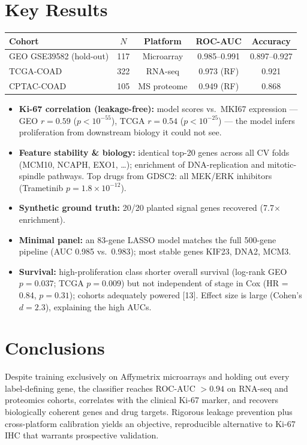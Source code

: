 \documentclass[10pt]{article}
\begin{document}
\section*{Key Results}
\begin{center}
\begin{tabular}{lcccc}
\toprule
Cohort & $N$ & Platform & ROC-AUC & Accuracy \\
\midrule
GEO GSE39582 (hold-out) & 117 & Microarray & 0.985--0.991 & 0.897--0.927 \\
TCGA-COAD & 322 & RNA-seq & 0.973 (RF) & 0.921 \\
CPTAC-COAD & 105 & MS proteome & 0.949 (RF) & 0.868 \\
\bottomrule
\end{tabular}
\end{center}

\begin{itemize}\setlength\itemsep{1pt}
\item \textbf{Ki-67 correlation (leakage-free):} model scores vs.\ MKI67 expression --- GEO $r=0.59$ ($p<10^{-55}$), TCGA $r=0.54$ ($p<10^{-25}$) --- the model infers proliferation from downstream biology it could not see.
\item \textbf{Feature stability \& biology:} identical top-20 genes across all CV folds (MCM10, NCAPH, EXO1, \ldots); enrichment of DNA-replication and mitotic-spindle pathways. Top drugs from GDSC2: all MEK/ERK inhibitors (Trametinib $p=1.8\times10^{-12}$).
\item \textbf{Synthetic ground truth:} 20/20 planted signal genes recovered (7.7$\times$ enrichment).
\item \textbf{Minimal panel:} an 83-gene LASSO model matches the full 500-gene pipeline (AUC 0.985 vs.\ 0.983); most stable genes KIF23, DNA2, MCM3.
\item \textbf{Survival:} high-proliferation class shorter overall survival (log-rank GEO $p=0.037$; TCGA $p=0.009$) but not independent of stage in Cox (HR = 0.84, $p=0.31$); cohorts adequately powered [13]. Effect size is large (Cohen's $d=2.3$), explaining the high AUCs.
\end{itemize}

\section*{Conclusions}
Despite training exclusively on Affymetrix microarrays and holding out every label-defining gene, the classifier reaches ROC-AUC $>0.94$ on RNA-seq and proteomics cohorts, correlates with the clinical Ki-67 marker, and recovers biologically coherent genes and drug targets. Rigorous leakage prevention plus cross-platform calibration yields an objective, reproducible alternative to Ki-67 IHC that warrants prospective validation.
\end{document}
